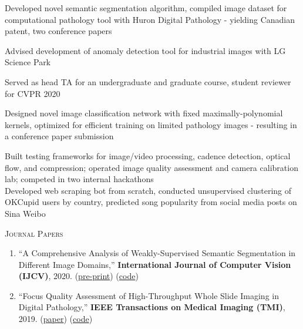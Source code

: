 \documentclass[letterpaper, 12pt]{cv_style}
\begin{document}
\begin{ditem}
	\item Developed novel semantic segmentation algorithm, compiled image dataset for computational pathology tool with Huron Digital Pathology - yielding Canadian patent, two conference papers
	\item Advised development of anomaly detection tool for industrial images with LG Science Park\\
	\item Served as head TA for an undergraduate and graduate course, student reviewer for CVPR 2020\\
\end{ditem}
%
\medspace
Designed novel image classification network with fixed maximally-polynomial kernels, optimized for efficient training on limited pathology images - resulting in a conference paper submission\\
\medspace
%

\medspace
Built testing frameworks for image/video processing, cadence detection, optical flow, and compression; operated image quality assessment and camera calibration lab; competed in two internal hackathons\\
\medspace
%
\medspace
Developed web scraping bot from scratch, conducted unsupervised clustering of OKCupid users by country, predicted song popularity from social media posts on Sina Weibo\\
\medspace

\textsc{Journal Papers}
\begin{enumerate}
	\item ``A Comprehensive Analysis of Weakly-Supervised Semantic Segmentation in Different Image Domains,'' \textbf{International Journal of Computer Vision (IJCV)}, 2020. (\href{https://arxiv.org/pdf/1912.11186.pdf}{pre-print}) (\href{https://github.com/lyndonchan/wsss-analysis}{code})
	\item ``Focus Quality Assessment of High-Throughput Whole Slide Imaging in Digital Pathology,'' \textbf{IEEE Transactions on Medical Imaging (TMI)}, 2019. (\href{https://ieeexplore.ieee.org/abstract/document/8725582}{paper}) (\href{https://github.com/mahdihosseini/FQPath}{code})
\end{enumerate}
\end{document}
